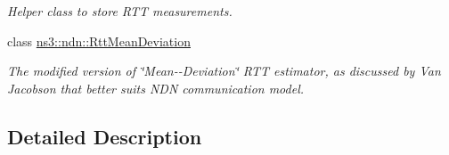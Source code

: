 \begin{DoxyCompactItemize}
\begin{DoxyCompactList}\small\item\em Helper class to store R\+TT measurements. \end{DoxyCompactList}\item 
class \hyperlink{classns3_1_1ndn_1_1RttMeanDeviation}{ns3\+::ndn\+::\+Rtt\+Mean\+Deviation}
\begin{DoxyCompactList}\small\item\em The modified version of \char`\"{}\+Mean-\/-\/\+Deviation\char`\"{} R\+TT estimator, as discussed by Van Jacobson that better suits N\+DN communication model. \end{DoxyCompactList}\end{DoxyCompactItemize}


\subsection{Detailed Description}
